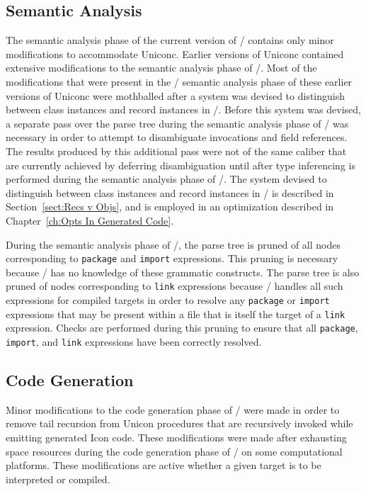 \subsection{Semantic Analysis}
The semantic analysis phase of the current version of \Ut/ contains only minor
modifications to accommodate Uniconc. Earlier versions of Uniconc contained
extensive modifications to the semantic analysis phase of \Ut/. Most of the
modifications that were present in the \Ut/ semantic analysis phase of these
earlier versions of Uniconc were mothballed after a system was devised to
distinguish between class instances and record instances in \Ic/. Before this
system was devised, a separate pass over the parse tree during the semantic
analysis phase of \Ut/ was necessary in order to attempt to disambiguate
invocations and field references. The results produced by this additional pass
were not of the same caliber that are currently achieved by deferring
disambiguation until after type inferencing is performed during the semantic
analysis phase of \Ic/. The system devised to distinguish between class
instances and record instances in \Ic/ is described in Section~\ref{sect:Recs v
Objs}, and is employed in an optimization described in Chapter~\ref{ch:Opts In
Generated Code}.

During the semantic analysis phase of \Ut/, the parse tree is pruned of all
nodes corresponding to \texttt{package} and \texttt{import} expressions. This
pruning is necessary because \Ic/ has no knowledge of these grammatic
constructs. The parse tree is also pruned of nodes corresponding to
\texttt{link} expressions because \Ut/ handles all such expressions for compiled
targets in order to resolve any \texttt{package} or \texttt{import} expressions
that may be present within a file that is itself the target of a \texttt{link}
expression. Checks are performed during this pruning to ensure that all
\texttt{package}, \texttt{import}, and \texttt{link} expressions have been
correctly resolved.

\subsection{Code Generation}

Minor modifications to the code generation phase of \Ut/ were made in
order to remove tail recursion from Unicon procedures that are
recursively invoked while emitting generated Icon code. These
modifications were made after exhausting space resources during the
code generation phase of \Ut/ on some computational platforms. These
modifications are active whether a given target is to be interpreted
or compiled.

